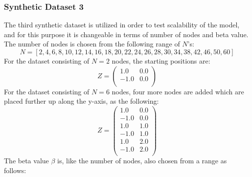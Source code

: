 \subsubsection{Synthetic Dataset 3}
\label{sec:Data:SyntheticData:SyntheticDataset3}
The third synthetic dataset is utilized in order to test scalability of the model, and for this purpose it is changeable in terms of number of nodes and beta value.
The number of nodes is chosen from the following range of $N$'s:
\begin{equation}
    N = [2, 4, 6, 8, 10, 12, 14, 16, 18, 20, 22, 24, 26, 28, 30, 34, 38, 42, 46, 50, 60]
\end{equation}
For the dataset consisting of $N = 2$ nodes, the starting positions are:
\begin{equation}
        Z = \left( \begin{matrix}
                1.0 & 0.0\\
                -1.0 & 0.0\\
                \end{matrix}\right)
\end{equation}
For the dataset consisting of $N = 6$ nodes, four more nodes are added which are placed further up along the y-axis, as the following:
\begin{equation}
        Z = \left( \begin{matrix}
                1.0 & 0.0\\
                -1.0 & 0.0\\
                1.0 & 1.0\\
                -1.0 & 1.0\\
                1.0 & 2.0\\
                -1.0 & 2.0\\
                \end{matrix}\right)
\end{equation}
The beta value $\beta$ is, like the number of nodes, also chosen from a range as follows:

